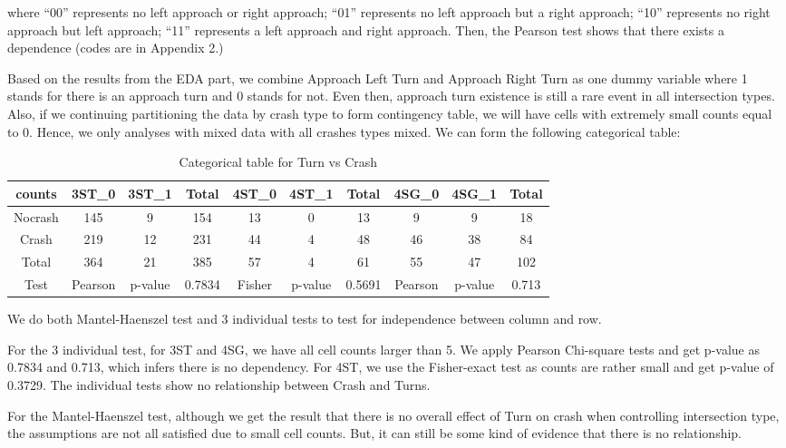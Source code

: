 \documentclass[11pt]{scrartcl} %
\begin{document}
where ``00'' represents no left approach or right approach; ``01'' represents no left approach but a right approach; ``10'' represents no right approach but left approach; ``11'' represents a left approach and right approach. Then, the Pearson test shows that there exists a dependence (codes are in Appendix 2.)

Based on the results from the EDA part, we combine Approach Left Turn and Approach Right Turn as one dummy variable where 1 stands for there is an approach turn and 0 stands for not. Even then, approach turn existence is still a rare event in all intersection types. Also, if we continuing partitioning the data by crash type to form contingency table, we will have cells with extremely small counts equal to 0. Hence, we only analyses with mixed data with all crashes types mixed. We can form the following categorical table:

\begin{table}[H]
\caption{Categorical table for Turn vs Crash}
\centering
\tiny
\begin{tabular}{|c|c|c|c|c|c|c|c|c|c|}
\hline
counts  & 3ST\_0 & 3ST\_1 & Total & 4ST\_0 & 4ST\_1 & Total & 4SG\_0 & 4SG\_1 & Total \\
\hline
Nocrash & 145  & 9 & 154  & 13 & 0 & 13 & 9 & 9 & 18 \\
\hline
Crash   & 219  & 12 & 231 & 44 & 4 & 48 & 46 & 38 & 84 \\
\hline
Total   & 364  & 21 & 385 & 57 & 4 & 61 & 55 & 47 & 102 \\
\hline
Test    & Pearson & p-value & 0.7834 & Fisher & p-value & 0.5691 & Pearson & p-value & 0.713 \\
\hline
\end{tabular}
\end{table}

We do both Mantel-Haenszel test and 3 individual tests to test for independence between column and row.

For the 3 individual test, for 3ST and 4SG, we have all cell counts larger than 5. We apply Pearson Chi-square tests and get p-value as 0.7834 and 0.713, which infers there is no dependency. For 4ST, we use the Fisher-exact test as counts are rather small and get p-value of 0.3729. The individual tests show no relationship between Crash and Turns.

For the Mantel-Haenszel test, although we get the result that there is no overall effect of Turn on crash when controlling intersection type, the assumptions are not all satisfied due to small cell counts. But, it can still be some kind of evidence that there is no relationship.
\end{document}
